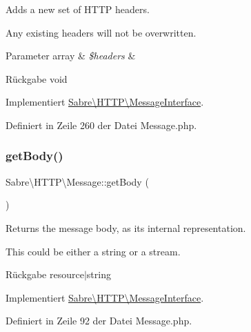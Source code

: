Adds a new set of H\+T\+TP headers.

Any existing headers will not be overwritten.


\begin{DoxyParams}[1]{Parameter}
array & {\em \$headers} & \\
\hline
\end{DoxyParams}
\begin{DoxyReturn}{Rückgabe}
void 
\end{DoxyReturn}


Implementiert \mbox{\hyperlink{interface_sabre_1_1_h_t_t_p_1_1_message_interface_a1c33f24f28689265b5c436939cc898b1}{Sabre\textbackslash{}\+H\+T\+T\+P\textbackslash{}\+Message\+Interface}}.



Definiert in Zeile 260 der Datei Message.\+php.

\mbox{\label{class_sabre_1_1_h_t_t_p_1_1_message_adbab038f2bd823f11e4ade75cc792f14}} 
\subsubsection{\texorpdfstring{get\+Body()}{getBody()}}
{\footnotesize\ttfamily Sabre\textbackslash{}\+H\+T\+T\+P\textbackslash{}\+Message\+::get\+Body (\begin{DoxyParamCaption}{ }\end{DoxyParamCaption})}

Returns the message body, as it\textquotesingle{}s internal representation.

This could be either a string or a stream.

\begin{DoxyReturn}{Rückgabe}
resource$\vert$string 
\end{DoxyReturn}


Implementiert \mbox{\hyperlink{interface_sabre_1_1_h_t_t_p_1_1_message_interface_a0738667a55e423f8510c84035b99f73d}{Sabre\textbackslash{}\+H\+T\+T\+P\textbackslash{}\+Message\+Interface}}.



Definiert in Zeile 92 der Datei Message.\+php.

\mbox{\label{class_sabre_1_1_h_t_t_p_1_1_message_ae4b1d83743287c4e0f6500fbb4ff3c13}} 
